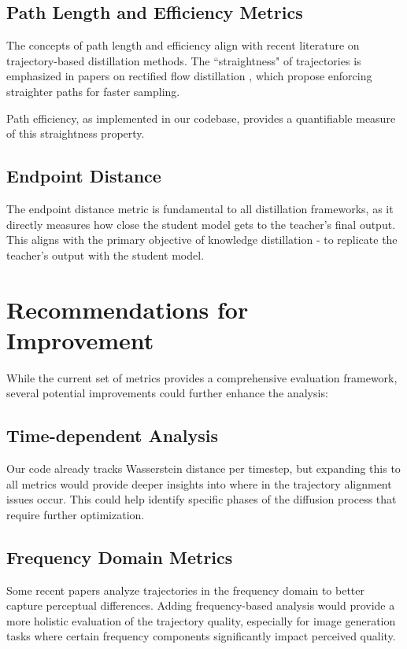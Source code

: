 \documentclass{article}
\begin{document}
\subsection{Path Length and Efficiency Metrics}
The concepts of path length and efficiency align with recent literature on trajectory-based distillation methods. The ``straightness" of trajectories is emphasized in papers on rectified flow distillation \cite{liu2023instaflow, zhu2024slimflow}, which propose enforcing straighter paths for faster sampling.

Path efficiency, as implemented in our codebase, provides a quantifiable measure of this straightness property.

\subsection{Endpoint Distance}
The endpoint distance metric is fundamental to all distillation frameworks, as it directly measures how close the student model gets to the teacher's final output. This aligns with the primary objective of knowledge distillation - to replicate the teacher's output with the student model.

\section{Recommendations for Improvement}

While the current set of metrics provides a comprehensive evaluation framework, several potential improvements could further enhance the analysis:

\subsection{Time-dependent Analysis}
Our code already tracks Wasserstein distance per timestep, but expanding this to all metrics would provide deeper insights into where in the trajectory alignment issues occur. This could help identify specific phases of the diffusion process that require further optimization.

\subsection{Frequency Domain Metrics}
Some recent papers analyze trajectories in the frequency domain to better capture perceptual differences. Adding frequency-based analysis would provide a more holistic evaluation of the trajectory quality, especially for image generation tasks where certain frequency components significantly impact perceived quality.
\end{document}

